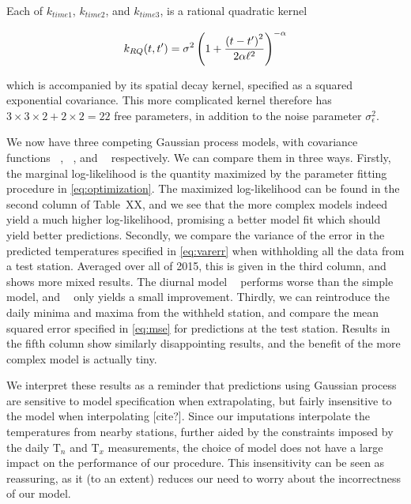 \documentclass[letter]{article}
\newcommand{\genericdel}[3]{%
      \left#1#3\right#2
    }
\newcommand{\del}[1]{\genericdel(){#1}}
\newcommand{\T}{\mathrm{T}}
\newcommand{\Tn}{\T_{n}}
\newcommand{\Tx}{\T_{x}}
\newcommand{\sigman}{\sigma_{\epsilon}}
\DeclareMathOperator{\kSESE}{k_{\mathtt{SExSE}}}
\DeclareMathOperator{\kdiurn}{k_{\mathtt{SESE_24}}}
\DeclareMathOperator{\ksumprod}{k_{\mathtt{sumprod}}}
\begin{document}
Each of \(k_{time1}\), \(k_{time2}\), and \(k_{time3}\), is a rational
quadratic kernel

\begin{equation}
    k_{RQ}(t,t') = \sigma^2 \del{1 + \frac{\del{t-t'}^2}{2\alpha\ell^2} }^{-\alpha}
\end{equation}

which is accompanied by its spatial decay kernel, specified as a squared
exponential covariance. This more complicated kernel therefore has
\(3 \times 3 \times 2 + 2 \times 2 = 22\) free parameters, in addition
to the noise parameter \(\sigman^2\).

We now have three competing Gaussian process models, with covariance
functions \(\kSESE\), \(\kdiurn\), and \(\ksumprod\) respectively. We
can compare them in three ways. Firstly, the marginal log-likelihood is
the quantity maximized by the parameter fitting procedure in
\eqref{eq:optimization}. The maximized log-likelihood can be found in
the second column of Table~XX, and we see that the more complex models
indeed yield a much higher log-likelihood, promising a better model fit
which should yield better predictions. Secondly, we compare the variance
of the error in the predicted temperatures specified in
\eqref{eq:varerr} when withholding all the data from a test station.
Averaged over all of 2015, this is given in the third column, and shows
more mixed results. The diurnal model \(\kdiurn\) performs worse than
the simple \(\kSESE\) model, and \(\ksumprod\) only yields a small
improvement. Thirdly, we can reintroduce the daily minima and maxima
from the withheld station, and compare the mean squared error specified
in \eqref{eq:mse} for predictions at the test station. Results in the
fifth column show similarly disappointing results, and the benefit of
the more complex model is actually tiny.

We interpret these results as a reminder that predictions using Gaussian
process are sensitive to model specification when extrapolating, but
fairly insensitive to the model when interpolating {[}cite?{]}. Since
our imputations interpolate the temperatures from nearby stations,
further aided by the constraints imposed by the daily \(\Tn\) and
\(\Tx\) measurements, the choice of model does not have a large impact
on the performance of our procedure. This insensitivity can be seen as
reassuring, as it (to an extent) reduces our need to worry about the
incorrectness of our model.
    
\end{document}
